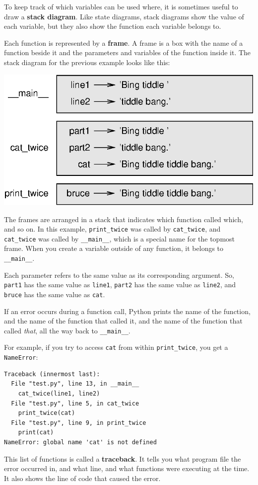 \documentclass[10pt]{book}
\begin{document}
To keep track of which variables can be used where, it is sometimes
useful to draw a {\bf stack diagram}.  Like state diagrams, stack
diagrams show the value of each variable, but they also show the
function each variable belongs to.


Each function is represented by a {\bf frame}.  A frame is a box
with the name of a function
beside it and the parameters and variables of the function inside it.
The stack diagram for the
previous example looks like this:

\beforefig
\centerline{\includegraphics{figs/stack.eps}}
\afterfig

The frames are arranged in a stack that indicates which function
called which, and so on.  In this example, \verb"print_twice"
was called by \verb"cat_twice", and \verb"cat_twice" was called by 
\verb"__main__", which is a special name for the topmost frame.  When
you create a variable outside of any function, it belongs to 
\verb"__main__".

Each parameter refers to the same value as its corresponding
argument.  So, {\tt part1} has the same value as
{\tt line1}, {\tt part2} has the same value as {\tt line2},
and {\tt bruce} has the same value as {\tt cat}.

If an error occurs during a function call, Python prints the
name of the function, and the name of the function that called
it, and the name of the function that called {\em that}, all the
way back to \verb"__main__".

For example, if you try to access {\tt cat} from within 
\verb"print_twice", you get a {\tt NameError}:

\beforeverb
\begin{verbatim}
Traceback (innermost last):
  File "test.py", line 13, in __main__
    cat_twice(line1, line2)
  File "test.py", line 5, in cat_twice
    print_twice(cat)
  File "test.py", line 9, in print_twice
    print(cat)
NameError: global name 'cat' is not defined
\end{verbatim}
\afterverb
%
This list of functions is called a {\bf traceback}.  It tells you what
program file the error occurred in, and what line, and what functions
were executing at the time.  It also shows the line of code that
caused the error.
\end{document}
